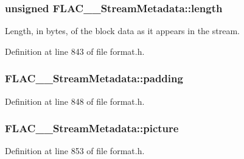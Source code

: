 \subsubsection[{\texorpdfstring{length}{length}}]{\setlength{\rightskip}{0pt plus 5cm}unsigned F\+L\+A\+C\+\_\+\+\_\+\+Stream\+Metadata\+::length}\hypertarget{struct_f_l_a_c_____stream_metadata_a3fd615e41609837a5672f9081d9d2183}{}\label{struct_f_l_a_c_____stream_metadata_a3fd615e41609837a5672f9081d9d2183}
Length, in bytes, of the block data as it appears in the stream. 

Definition at line 843 of file format.\+h.

\subsubsection[{\texorpdfstring{padding}{padding}}]{ F\+L\+A\+C\+\_\+\+\_\+\+Stream\+Metadata\+::padding}\hypertarget{struct_f_l_a_c_____stream_metadata_a202f0ed2fa1dae32893be6025838f651}{}\label{struct_f_l_a_c_____stream_metadata_a202f0ed2fa1dae32893be6025838f651}


Definition at line 848 of file format.\+h.

\subsubsection[{\texorpdfstring{picture}{picture}}]{ F\+L\+A\+C\+\_\+\+\_\+\+Stream\+Metadata\+::picture}\hypertarget{struct_f_l_a_c_____stream_metadata_a203cf5cce24097ef96efd5dd3bb7c8e7}{}\label{struct_f_l_a_c_____stream_metadata_a203cf5cce24097ef96efd5dd3bb7c8e7}


Definition at line 853 of file format.\+h.

